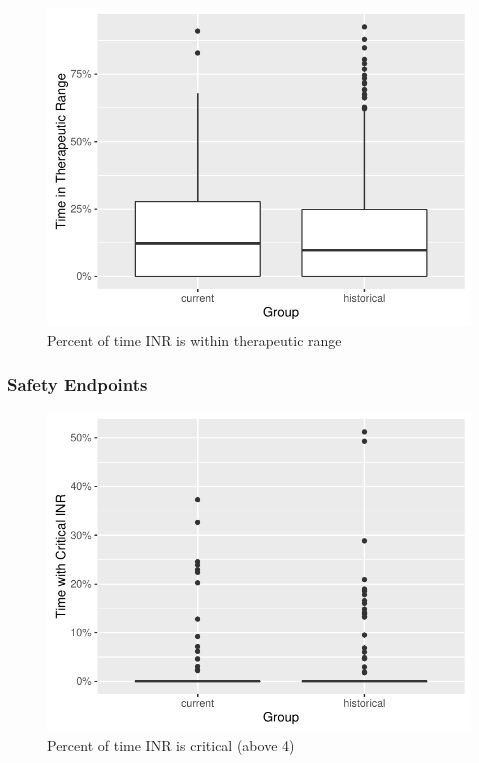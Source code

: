 \documentclass[]{article}
\begin{document}
\begin{figure}[H]
\centering
\includegraphics{warfarin_analysis_ASHP_files/figure-latex/ttr_hist-1.pdf}
\caption{Percent of time INR is within therapeutic range}
\end{figure}

\subsubsection{Safety Endpoints}\label{safety-endpoints-1}

\begin{figure}[H]
\centering
\includegraphics{warfarin_analysis_ASHP_files/figure-latex/critical_hist-1.pdf}
\caption{Percent of time INR is critical (above 4)}
\end{figure}
\end{document}
